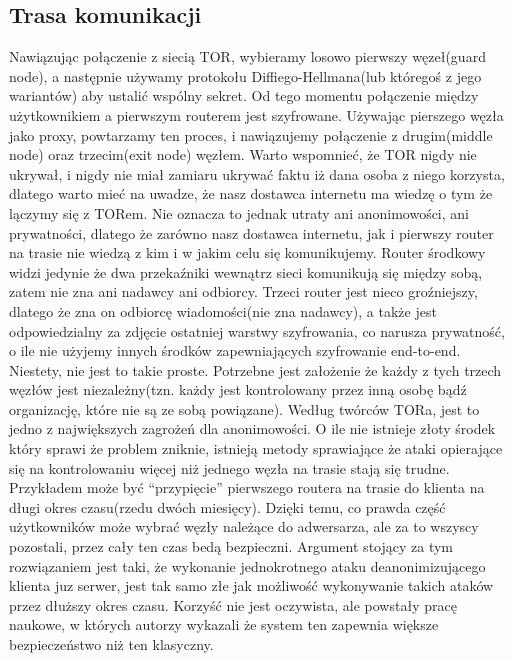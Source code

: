 \documentclass[polish]{kbk}
\begin{document}
\subsection{Trasa komunikacji}
Nawiązując połączenie z siecią TOR, wybieramy losowo pierwszy węzeł(guard node),
a następnie używamy protokołu Diffiego-Hellmana(lub któregoś z jego wariantów) aby 
ustalić wspólny sekret. Od tego momentu połączenie między użytkownikiem a pierwszym
routerem jest szyfrowane. Używając pierszego węzła jako proxy, powtarzamy ten proces, 
i nawiązujemy połączenie z drugim(middle node) oraz trzecim(exit node) węzłem.
Warto wspomnieć, że TOR nigdy nie ukrywał, i nigdy nie miał zamiaru ukrywać faktu
iż dana osoba z niego korzysta, dlatego warto mieć na uwadze, że nasz dostawca 
internetu ma wiedzę o tym że lączymy się z TORem. Nie oznacza to jednak utraty
ani anonimowości, ani prywatności, dlatego że zarówno nasz dostawca internetu, jak 
i pierwszy router na trasie nie wiedzą z kim i w jakim celu się komunikujemy.
Router środkowy widzi jedynie że dwa przekaźniki wewnątrz sieci komunikują się
między sobą, zatem nie zna ani nadawcy ani odbiorcy. Trzeci router jest nieco 
groźniejszy, dlatego że zna on odbiorcę wiadomości(nie zna nadawcy), a także
jest odpowiedzialny za zdjęcie ostatniej warstwy szyfrowania, co narusza prywatność,
o ile nie użyjemy innych środków zapewniających szyfrowanie end-to-end.
Niestety, nie jest to takie proste. Potrzebne jest założenie że każdy
z tych trzech węzłów jest niezależny(tzn. każdy jest kontrolowany przez inną 
osobę bądź organizację, które nie są ze sobą powiązane). Według twórców 
TORa\cite{secondgeneration}, jest to jedno z największych zagrożeń dla anonimowości.
O ile nie istnieje złoty środek który sprawi że problem zniknie, istnieją metody 
sprawiające że ataki opierające się na kontrolowaniu więcej niż jednego węzła na trasie
stają się trudne. Przykładem może być ``przypięcie'' pierwszego routera na trasie do 
klienta na długi okres czasu(rzedu dwóch miesięcy). Dzięki temu, co prawda część 
użytkowników może wybrać węzły należące do adwersarza, ale za to wszyscy pozostali,
przez cały ten czas bedą bezpieczni. Argument stojący za tym rozwiązaniem jest taki,
że  wykonanie jednokrotnego ataku deanonimizującego klienta juz serwer, jest tak samo 
złe jak możliwość wykonywanie takich ataków przez dłuższy okres czasu. Korzyść nie jest
oczywista, ale powstały pracę naukowe\cite{entryguard}, w których autorzy wykazali 
że system ten zapewnia większe bezpieczeństwo niż ten klasyczny.
\end{document}
